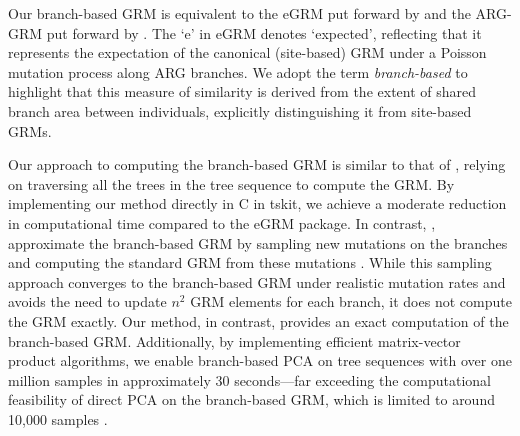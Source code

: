 Our branch-based GRM is equivalent to the eGRM put forward by \cite{fan2022genealogical} and the ARG-GRM put forward by \cite{zhang2023biobank}. The `e' in eGRM denotes `expected', reflecting that it represents the expectation of the canonical (site-based) GRM under a Poisson mutation process along ARG branches. We adopt the term \textit{branch-based} to highlight that this measure of similarity is derived from the extent of shared branch area between individuals, explicitly distinguishing it from site-based GRMs.

Our approach to computing the branch-based GRM is similar to that of \cite{fan2022genealogical}, relying on traversing all the trees in the tree sequence to compute the GRM. By implementing our method directly in C in tskit, we achieve a moderate reduction in computational time compared to the eGRM package. In contrast, \cite{zhang2023biobank}, approximate the branch-based GRM by sampling new mutations on the branches and computing the standard GRM from these mutations
\citep{vanraden2008efficient, yang2010common}. While this sampling approach converges to the branch-based GRM under realistic mutation rates and avoids the need to update $n^2$ GRM elements for each branch, it does not compute the GRM exactly. Our method, in contrast, provides an exact computation of the branch-based GRM. Additionally, by implementing efficient matrix-vector product algorithms, we enable branch-based PCA on tree sequences with over one million samples in approximately 30 seconds—far exceeding the computational feasibility of direct PCA on the branch-based GRM, which is limited to around 10,000 samples \citep{fan2022genealogical}.




